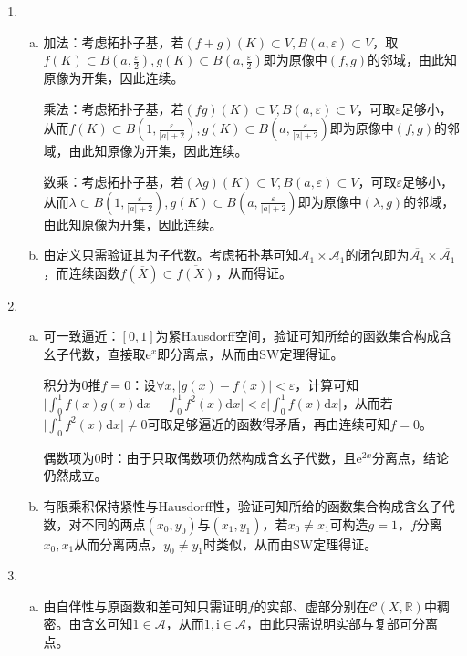 \documentclass[a4paper,UTF8,fontset=windows]{ctexart}
\begin{document}
\begin{enumerate}[(1)]
    \item
    \begin{enumerate}[(a)]
    \item
    加法：考虑拓扑子基，若$(f+g)(K)\subset V,B(a,\varepsilon)\subset V$，取$f(K)\subset B(a,\frac{\varepsilon}{2}),g(K)\subset B(a,\frac{\varepsilon}{2})$即为原像中$(f,g)$的邻域，由此知原像为开集，因此连续。
    
    乘法：考虑拓扑子基，若$(fg)(K)\subset V,B(a,\varepsilon)\subset V$，可取$\varepsilon$足够小，从而$f(K)\subset B(1,\frac{\varepsilon}{|a|+2}),g(K)\subset B(a,\frac{\varepsilon}{|a|+2})$即为原像中$(f,g)$的邻域，由此知原像为开集，因此连续。
    
    数乘：考虑拓扑子基，若$(\lambda g)(K)\subset V,B(a,\varepsilon)\subset V$，可取$\varepsilon$足够小，从而$\lambda\subset B(1,\frac{\varepsilon}{|a|+2}),g(K)\subset B(a,\frac{\varepsilon}{|a|+2})$即为原像中$(\lambda,g)$的邻域，由此知原像为开集，因此连续。
    
    \item
    由定义只需验证其为子代数。考虑拓扑基可知$\mathcal{A}_1\times\mathcal{A}_1$的闭包即为$\overline{\mathcal{A}_1}\times\overline{\mathcal{A}_1}$，而连续函数$f(\overline{X})\subset\overline{f(X)}$，从而得证。
    \end{enumerate}
    
    \item
    \begin{enumerate}[(a)]
    \item
    可一致逼近：$[0,1]$为紧Hausdorff空间，验证可知所给的函数集合构成含幺子代数，直接取$\mathrm{e}^x$即分离点，从而由SW定理得证。
    
    积分为0推$f=0$：设$\forall x,|g(x)-f(x)|<\varepsilon$，计算可知$\big|\int_0^1f(x)g(x)\mathrm{d}x-\int_0^1f^2(x)\mathrm{d}x\big|<\varepsilon\big|\int_0^1f(x)\mathrm{d}x\big|$，从而若$\big|\int_0^1f^2(x)\mathrm{d}x\big|\ne0$可取足够逼近的函数得矛盾，再由连续可知$f=0$。
    
    偶数项为0时：由于只取偶数项仍然构成含幺子代数，且$\mathrm{e}^{2x}$分离点，结论仍然成立。
    
    \item
    有限乘积保持紧性与Hausdorff性，验证可知所给的函数集合构成含幺子代数，对不同的两点$(x_0,y_0)$与$(x_1,y_1)$，若$x_0\ne x_1$可构造$g=1$，$f$分离$x_0,x_1$从而分离两点，$y_0\ne y_1$时类似，从而由SW定理得证。
    \end{enumerate}
    
    \item
    \begin{enumerate}[(a)]
    \item
    由自伴性与原函数和差可知只需证明$f$的实部、虚部分别在$\mathcal{C}(X,\mathbb{R})$中稠密。由含幺可知$1\in\mathcal{A}$，从而$1,\mathrm{i}\in\mathcal{A}$，由此只需说明实部与复部可分离点。
    

\end{enumerate}
\end{enumerate}
\end{document}
